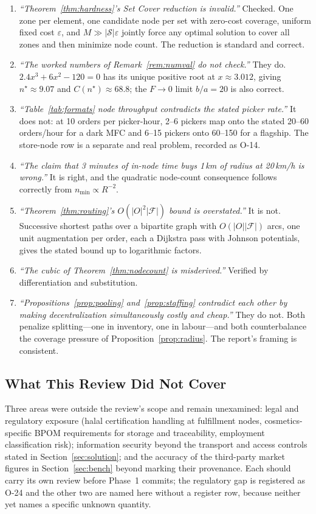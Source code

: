 \documentclass[10pt,twocolumn,letterpaper]{article}
\theoremstyle{definition}
\begin{document}
\begin{enumerate}
\item \emph{``Theorem~\ref{thm:hardness}'s Set Cover reduction is invalid.''} Checked. One zone per element, one candidate node per set with zero-cost coverage, uniform fixed cost $\varepsilon$, and $M\gg|\mathcal{S}|\varepsilon$ jointly force any optimal solution to cover all zones and then minimize node count. The reduction is standard and correct.
\item \emph{``The worked numbers of Remark~\ref{rem:numval} do not check.''} They do. $2.4x^3+6x^2-120=0$ has its unique positive root at $x\approx3.012$, giving $n^\star\approx9.07$ and $C(n^\star)\approx68.8$; the $F\to0$ limit $b/a=20$ is also correct.
\item \emph{``Table~\ref{tab:formats} node throughput contradicts the stated picker rate.''} It does not: at 10 orders per picker-hour, 2--6 pickers map onto the stated 20--60 orders/hour for a dark MFC and 6--15 pickers onto 60--150 for a flagship. The store-node row is a separate and real problem, recorded as O-14.
\item \emph{``The claim that 3 minutes of in-node time buys 1\,km of radius at 20\,km/h is wrong.''} It is right, and the quadratic node-count consequence follows correctly from $n_{\min}\propto R^{-2}$.
\item \emph{``Theorem~\ref{thm:routing}'s $O(|O|^2|\mathcal{F}|)$ bound is overstated.''} It is not. Successive shortest paths over a bipartite graph with $O(|O||\mathcal{F}|)$ arcs, one unit augmentation per order, each a Dijkstra pass with Johnson potentials, gives the stated bound up to logarithmic factors.
\item \emph{``The cubic of Theorem~\ref{thm:nodecount} is misderived.''} Verified by differentiation and substitution.
\item \emph{``Propositions~\ref{prop:pooling} and~\ref{prop:staffing} contradict each other by making decentralization simultaneously costly and cheap.''} They do not. Both penalize splitting---one in inventory, one in labour---and both counterbalance the coverage pressure of Proposition~\ref{prop:radius}. The report's framing is consistent.
\end{enumerate}

\subsection{What This Review Did Not Cover}

Three areas were outside the review's scope and remain unexamined: legal and regulatory exposure (halal certification handling at fulfillment nodes, cosmetics-specific BPOM requirements for storage and traceability, employment classification risk); information security beyond the transport and access controls stated in Section~\ref{sec:solution}; and the accuracy of the third-party market figures in Section~\ref{sec:bench} beyond marking their provenance. Each should carry its own review before Phase~1 commits; the regulatory gap is registered as O-24 and the other two are named here without a register row, because neither yet names a specific unknown quantity.
\end{document}
